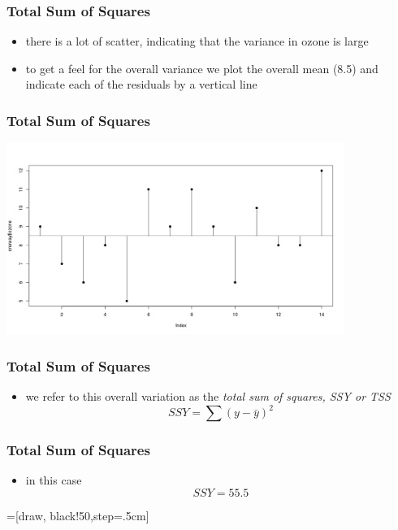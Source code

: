 \begin{frame}\frametitle{Total Sum of Squares}
  \begin{itemize}
  \item  there is a lot of scatter, indicating that the variance in ozone is large
  \item to get a feel for the overall variance we plot the overall mean (8.5) and indicate each of the residuals by a vertical line
  \end{itemize}
\end{frame}

\begin{frame}\frametitle{Total Sum of Squares}
\begin{center}
\includegraphics[width=11cm]{img/TSS.png}
\end{center}
\end{frame}

\begin{frame}\frametitle{Total Sum of Squares}
  \begin{itemize}
  \item we refer to this overall variation as the \emph{total sum of squares, SSY or TSS} 
$$ SSY = \sum(y-\bar{y})^2$$
  \end{itemize}
\end{frame}

\begin{frame}\frametitle{Total Sum of Squares}
  \begin{itemize}
  \item in this case $$SSY = 55.5$$
  \end{itemize}
   =[draw, black!50,step=.5cm]
\end{frame}



